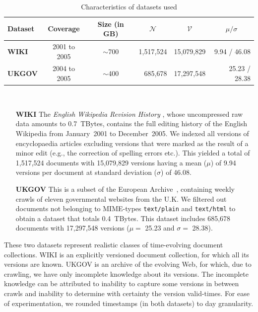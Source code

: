 \begin{table}
  \center
  \begin{tabular}{l c c r r r} 
      \toprule
      { Dataset} & \multicolumn{1}{c}{Coverage}&  \multicolumn{1}{c}{Size (in GB)} & \multicolumn{1}{c}{$\mathcal{N}$} & \multicolumn{1}{c}{$\mathcal{V}$} & \multicolumn{1}{c}{$\mu / \sigma$}\\
      \midrule
      {\bf WIKI} & 2001  to 2005  & $\sim$700 & 1,517,524 & 15,079,829 & 9.94 / 46.08\\

      {\bf UKGOV} & 2004 to 2005 & $\sim$400 & 685,678 & 17,297,548 & 25.23 / 28.38\\
      \bottomrule
    \end{tabular}\\
  \caption{Characteristics of datasets used}
  \label{tab:datasets}
\end{table}

\begin{enumerate}
\item[\textbf{WIKI}]
{The \emph{English Wikipedia Revision History}
    \cite{wiki}, whose uncompressed raw data amounts to 0.7~TBytes,
    contains the full editing history of the English Wikipedia from
    January~2001 to December~2005. We indexed all versions of
    encyclopaedia articles excluding versions that were marked as the
    result of a minor edit (e.g., the correction of spelling errors
    etc.). This yielded a total of 1,517,524 documents with 15,079,829
    versions having a mean ($\mu$) of 9.94 versions per document at
    standard deviation ($\sigma$) of 46.08.}
    
\item[\textbf{UKGOV}]
  { This is a subset of the European Archive~\cite{ea}, containing
    weekly crawls of eleven governmental websites from the U.K. We
    filtered out documents not belonging to MIME-types
    \texttt{text/plain} and \texttt{text/html} to obtain a dataset
    that totals 0.4~TBytes. This dataset includes 685,678 documents
    with 17,297,548 versions ($\mu = $ 25.23 and $\sigma = $ 28.38).}
    
\end{enumerate}

These two datasets represent realistic classes of
time-evolving document collections. WIKI is an explicitly versioned
document collection, for which all its versions are known. UKGOV is an
archive of the evolving Web, for which, due to crawling, we have only
incomplete knowledge about its versions. The incomplete knowledge can be attributed to inability to capture some versions in between crawls and inability to determine with certainty the version valid-times. For ease of experimentation,
we rounded timestamps (in both datasets) to day granularity.


